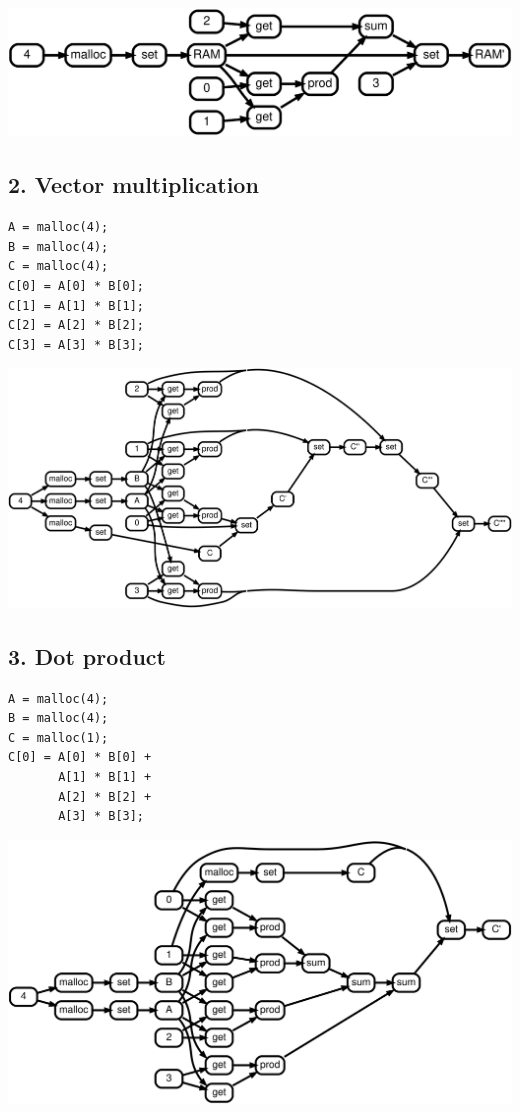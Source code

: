 \documentclass[sigplan,10pt,review,anonymous]{acmart}
\begin{document}
\includegraphics[scale=0.1]{rtd31}

\subsection*{2. Vector multiplication}

\begin{lstlisting}
A = malloc(4);
B = malloc(4);
C = malloc(4);
C[0] = A[0] * B[0];
C[1] = A[1] * B[1];
C[2] = A[2] * B[2];
C[3] = A[3] * B[3];
\end{lstlisting}

\includegraphics[scale=0.1]{rtd32}

\subsection*{3. Dot product}

\begin{lstlisting}
A = malloc(4);
B = malloc(4);
C = malloc(1);
C[0] = A[0] * B[0] +
       A[1] * B[1] +
       A[2] * B[2] +
       A[3] * B[3];
\end{lstlisting}

\includegraphics[scale=0.1]{rtd33}
\end{document}
